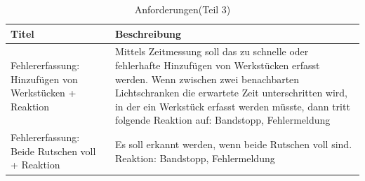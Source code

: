 \documentclass[a4paper, 11pt]{article}
\begin{document}
\newpage

\begin{table}[h]
\center
\begin{tabularx}{\textwidth}{|X|X|}
\hline
\textbf{Titel}&\textbf{Beschreibung}\\
\hline
Fehlererfassung: Hinzufügen von Werkstücken + Reaktion&Mittels Zeitmessung soll das zu schnelle oder fehlerhafte Hinzufügen von Werkstücken erfasst werden. Wenn zwischen zwei benachbarten Lichtschranken die erwartete Zeit unterschritten wird, in der ein Werkstück erfasst werden müsste, dann tritt folgende Reaktion auf: Bandstopp, Fehlermeldung \\
\hline
Fehlererfassung: Beide Rutschen voll + Reaktion&Es soll erkannt werden, wenn beide Rutschen voll sind. Reaktion: Bandstopp, Fehlermeldung \\
\hline
\end{tabularx}
\caption{Anforderungen(Teil 3)}
\label{anf3}
\end{table}
\end{document}
